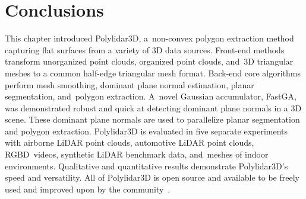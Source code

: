 

\section{Conclusions}\label{sec:ch3_conclusion}

This chapter introduced Polylidar3D, a~non-convex polygon extraction method  capturing flat surfaces from a variety of 3D data sources. Front-end methods transform unorganized point clouds, organized point clouds, and~3D triangular meshes to a common half-edge triangular mesh format. Back-end core algorithms perform mesh smoothing, dominant plane normal estimation, planar segmentation, and~polygon extraction. A~novel Gaussian accumulator, FastGA, was demonstrated robust and quick at detecting dominant plane normals in a 3D scene. These dominant plane normals are used to parallelize planar segmentation and polygon extraction. Polylidar3D is evaluated in five separate experiments with airborne LiDAR point clouds, automotive LiDAR point clouds, \ac{RGBD}~videos, synthetic LiDAR benchmark data, and~meshes of indoor environments. Qualitative and quantitative results demonstrate Polylidar3D's speed and versatility. All of Polylidar3D is open source and available to be freely used and improved upon by the community~\cite{Castagno_Github_Polylidar, Castagno_Github_fastga, Castagno_Github_opf}. 

